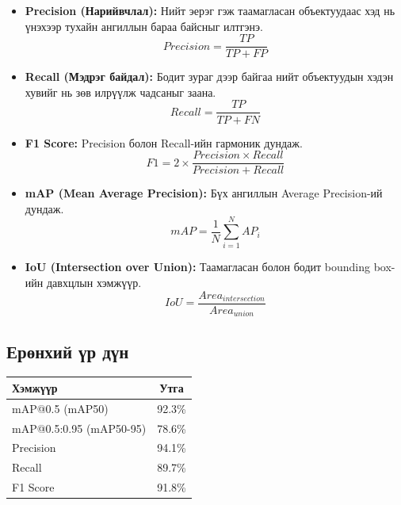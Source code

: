 \begin{itemize}
    \item \textbf{Precision (Нарийвчлал):} Нийт эерэг гэж таамагласан объектуудаас хэд нь үнэхээр тухайн ангиллын бараа байсныг илтгэнэ.
    \begin{equation}
        Precision = \frac{TP}{TP + FP}
    \end{equation}
    
    \item \textbf{Recall (Мэдрэг байдал):} Бодит зураг дээр байгаа нийт объектуудын хэдэн хувийг нь зөв илрүүлж чадсаныг заана.
    \begin{equation}
        Recall = \frac{TP}{TP + FN}
    \end{equation}
    
    \item \textbf{F1 Score:} Precision болон Recall-ийн гармоник дундаж.
    \begin{equation}
        F1 = 2 \times \frac{Precision \times Recall}{Precision + Recall}
    \end{equation}
    
    \item \textbf{mAP (Mean Average Precision):} Бүх ангиллын Average Precision-ий дундаж.
    \begin{equation}
        mAP = \frac{1}{N} \sum_{i=1}^{N} AP_i
    \end{equation}
    
    \item \textbf{IoU (Intersection over Union):} Таамагласан болон бодит bounding box-ийн давхцлын хэмжүүр.
    \begin{equation}
        IoU = \frac{Area_{intersection}}{Area_{union}}
    \end{equation}
\end{itemize}

\subsection{Ерөнхий үр дүн}

\begin{table}[H]
\centering
\caption{Загварын ерөнхий үнэлгээний үр дүн}
\label{tab:overall_results}
\begin{longtable}{|l|c|}
\hline
\textbf{Хэмжүүр} & \textbf{Утга} \\
\hline
mAP@0.5 (mAP50) & 92.3\% \\
\hline
mAP@0.5:0.95 (mAP50-95) & 78.6\% \\
\hline
Precision & 94.1\% \\
\hline
Recall & 89.7\% \\
\hline
F1 Score & 91.8\% \\
\hline
\end{longtable}
\end{table}

